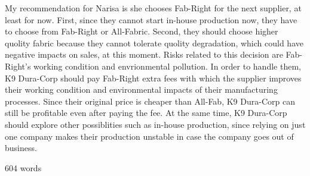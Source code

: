 \documentclass[paper=a4,12pt]{article}
\begin{document}
My recommendation for Narisa is she chooses Fab-Right for the next supplier, at least for now. First, since they cannot start in-house production now, they have to choose from Fab-Right or All-Fabric. Second, they should choose higher quolity fabric because they cannot tolerate quolity degradation, which could have negative impacts on sales, at this moment. Risks related to this decision are Fab-Right's working condition and envrionmental pollution. In order to handle them, K9 Dura-Corp should pay Fab-Right extra fees with which the supplier improves their working condition and environmental impacts of their manufacturing processes. Since their original price is cheaper than All-Fab, K9 Dura-Corp can still be profitable even after paying the fee. At the same time, K9 Dura-Corp should explore other possiblities such as in-house production, since relying on just one company makes their production unstable in case the company goes out of business.

604 words

\printbibliography
\end{document}
